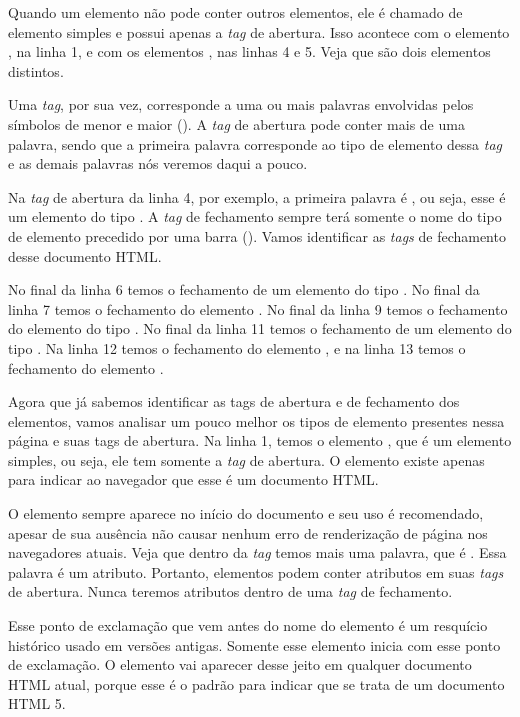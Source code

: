 Quando um elemento não pode conter outros elementos, ele é chamado de elemento simples e possui apenas a \textit{tag} de abertura. Isso acontece com o elemento , na linha 1, e com os elementos , nas linhas 4 e 5. Veja que são dois elementos distintos.

Uma \textit{tag}, por sua vez, corresponde a uma ou mais palavras envolvidas pelos símbolos de menor e maior (). A \textit{tag} de abertura pode conter mais de uma palavra, sendo que a primeira palavra corresponde ao tipo de elemento  dessa \textit{tag} e as demais palavras nós veremos daqui a pouco. 

Na \textit{tag} de abertura da linha 4, por exemplo, a primeira palavra é , ou seja, esse é um elemento  do tipo . A \textit{tag} de fechamento sempre terá somente o nome do tipo de elemento  precedido por uma barra (). Vamos identificar as \textit{tags} de fechamento desse documento HTML. 

No final da linha 6 temos o fechamento de um elemento do tipo . No final da linha 7 temos o fechamento do elemento . No final da linha 9 temos o fechamento do elemento do tipo . No final da linha 11 temos o fechamento de um elemento do tipo . Na linha 12 temos o fechamento do elemento , e na linha 13 temos o fechamento do elemento .

Agora que já sabemos identificar as tags de abertura e de fechamento dos elementos, vamos analisar um pouco melhor os tipos de elemento presentes nessa página e suas tags de abertura. Na linha 1, temos o elemento , que é um elemento simples, ou seja, ele tem somente a \textit{tag} de abertura. O elemento  existe apenas para indicar ao navegador que esse é um documento HTML. 

O elemento  sempre aparece no início do documento e seu uso é recomendado, apesar de sua ausência não causar nenhum erro de renderização de página nos navegadores atuais. Veja que dentro da \textit{tag}  temos mais uma palavra, que é . Essa palavra é um atributo. Portanto, elementos podem conter atributos em suas \textit{tags} de abertura. Nunca teremos atributos dentro de uma \textit{tag} de fechamento.

Esse ponto de exclamação que vem antes do nome do elemento  é um resquício histórico usado em versões antigas. Somente esse elemento inicia com esse ponto de exclamação. O elemento  vai aparecer desse jeito em qualquer documento HTML atual, porque esse é o padrão para indicar que se trata de um documento HTML 5.


